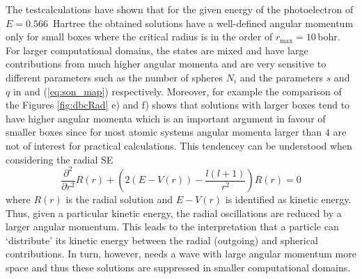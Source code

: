 The testcalculations have shown that for the given energy of the photoelectron of $E=0.566\,$ Hartree the obtained solutions have a well-defined angular momentum only for small boxes where the critical radius is in the order of $r_\text{max}=10\,$bohr.
For larger computational domains, the states are mixed and have large contributions from much higher angular momenta and are very sensitive to different parameters such as the number of spheres $N_i$ and the parameters $s$ and $q$ in   and (\ref{eq:son_map}) respectively.
Moreover, for example the comparison of the Figures \ref{fig:dbcRad} e) and f) shows that solutions with larger boxes tend to have higher angular momenta which is an important argument in favour of smaller boxes since for most atomic systems angular momenta larger than $4$ are not of interest for practical calculations.
This tendencey can be understood when considering the radial SE \cite{Lifschitz}
\begin{equation}
\frac{\partial^2}{\partial r^2} R(r) + \left(2\left(E-V(r)\right) -\frac{l(l+1)}{r^2}\right) R(r)=0
\end{equation}
where $R(r)$ is the radial solution and $E-V(r)$ is identified as kinetic energy.
Thus, given a particular kinetic energy, the radial oscillations are reduced by a larger angular momentum.
This leads to the interpretation that a particle can `distribute' its kinetic energy between the radial (outgoing) and spherical contributions.
In turn, however, needs a wave with large angular momentum more space and thus these solutions are suppressed in smaller computational domains.

